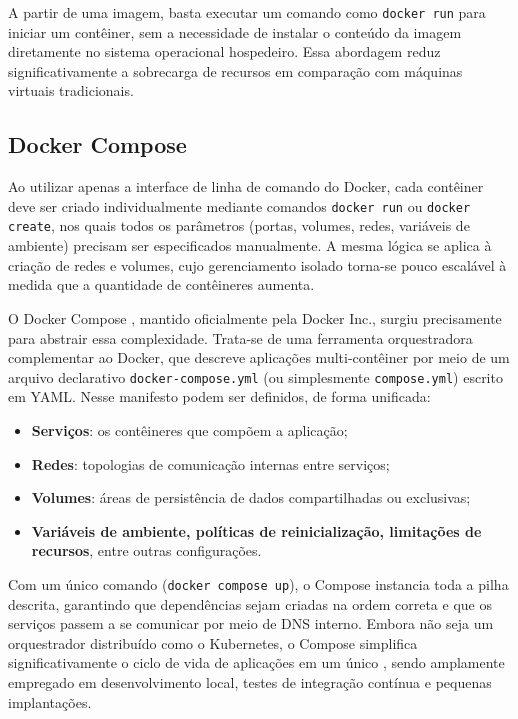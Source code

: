 A partir de uma imagem, basta executar um comando como \verb|docker run| para iniciar um contêiner, sem a necessidade de instalar o conteúdo da imagem diretamente no sistema operacional hospedeiro. Essa abordagem reduz significativamente a sobrecarga de recursos em comparação com máquinas virtuais tradicionais.

\subsection{Docker Compose}
\label{subsection:DockerCompose}

Ao utilizar apenas a interface de linha de comando do Docker, cada contêiner deve ser criado individualmente mediante comandos \verb|docker run| ou \verb|docker create|, nos quais todos os parâmetros (portas, volumes, redes, variáveis de ambiente) precisam ser especificados manualmente. A mesma lógica se aplica à criação de redes e volumes, cujo gerenciamento isolado torna-se pouco escalável à medida que a quantidade de contêineres aumenta.

O Docker Compose \citep{dockercmpse2025}, mantido oficialmente pela Docker Inc., surgiu precisamente para abstrair essa complexidade. Trata-se de uma ferramenta orquestradora complementar ao Docker, que descreve aplicações multi-contêiner por meio de um arquivo declarativo \verb|docker-compose.yml| (ou simplesmente \verb|compose.yml|) escrito em YAML. Nesse manifesto podem ser definidos, de forma unificada:

\begin{itemize}
\item \textbf{Serviços}: os contêineres que compõem a aplicação;
\item \textbf{Redes}: topologias de comunicação internas entre serviços;
\item \textbf{Volumes}: áreas de persistência de dados compartilhadas ou exclusivas;
\item \textbf{Variáveis de ambiente, políticas de reinicialização, limitações de recursos}, entre outras configurações.
\end{itemize}

Com um único comando (\verb|docker compose up|), o Compose instancia toda a pilha descrita, garantindo que dependências sejam criadas na ordem correta e que os serviços passem a se comunicar por meio de DNS interno. Embora não seja um orquestrador distribuído como o Kubernetes, o Compose simplifica significativamente o ciclo de vida de aplicações em um único , sendo amplamente empregado em desenvolvimento local, testes de integração contínua e pequenas implantações.

